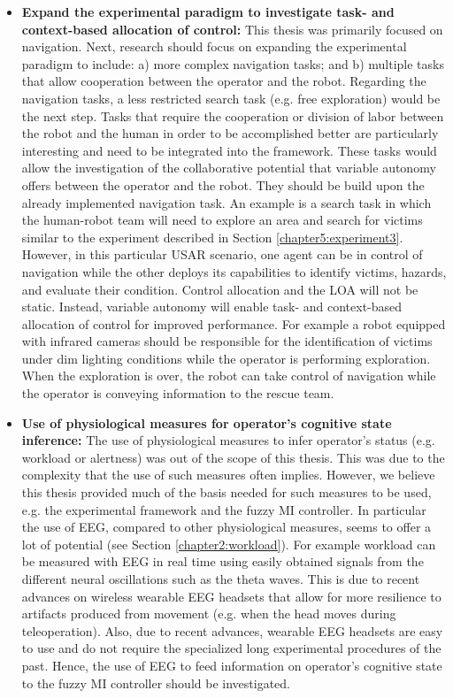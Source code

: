 \documentclass[a4paper,12pt,oneside,openright]{bhamthesis}
\begin{document}
\begin{itemize}
\item \textbf{Expand the experimental paradigm to investigate task- and context-based allocation of control:} This thesis was primarily focused on navigation. Next, research should focus on expanding the experimental paradigm to include: a) more complex navigation tasks; and b) multiple tasks that allow cooperation between the operator and the robot. Regarding the navigation tasks, a less restricted search task (e.g. free exploration) would be the next step. Tasks that require the cooperation or division of labor between the robot and the human in order to be accomplished better are particularly interesting and need to be integrated into the framework. These tasks would allow the investigation of the collaborative potential that variable autonomy offers between the operator and the robot. They should be build upon the already implemented navigation task. An example is a search task in which the human-robot team will need to explore an area and search for victims similar to the experiment described in Section \ref{chapter5:experiment3}. However, in this particular USAR scenario, one agent can be in control of navigation while the other deploys its capabilities to identify victims, hazards, and evaluate their condition. Control allocation and the LOA will not be static. Instead, variable autonomy will enable task- and context-based allocation of control for improved performance. For example a robot equipped with infrared cameras should be responsible for the identification of victims under dim lighting conditions while the operator is performing exploration. When the exploration is over, the robot can take control of navigation while the operator is conveying information to the rescue team.
 
 \item \textbf{Use of physiological measures for operator's cognitive state inference:} The use of physiological measures to infer operator's status (e.g. workload or alertness) was out of the scope of this thesis. This was due to the complexity that the use of such measures often implies. However, we believe this thesis provided much of the basis needed for such measures to be used, e.g. the experimental framework and the fuzzy MI controller. In particular the use of EEG, compared to other physiological measures, seems to offer a lot of potential (see Section \ref{chapter2:workload}). For example workload can be measured with EEG in real time using easily obtained signals from the different neural oscillations such as the theta waves. This is due to recent advances on wireless wearable EEG headsets that allow for more resilience to artifacts produced from movement (e.g. when the head moves during teleoperation). Also, due to recent advances, wearable EEG headsets are easy to use and do not require the specialized long experimental procedures of the past. Hence, the use of EEG to feed information on operator's cognitive state to the fuzzy MI controller should be investigated.

\end{itemize}
\end{document}
